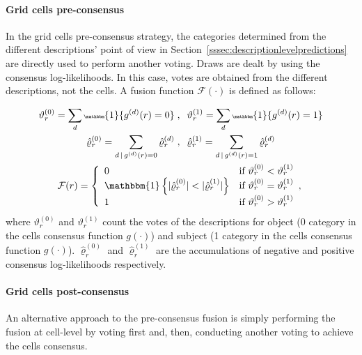 \documentclass[10pt,twocolumn,letterpaper]{article}
\begin{document}
\paragraph{Grid cells pre-consensus}

In the grid cells pre-consensus strategy, the categories determined from the different descriptions' point of view in Section~\ref{sssec:descriptionlevelpredictions} are directly used to perform another voting. Draws are dealt by using the consensus log-likelihoods. In this case, votes are obtained from the different descriptions, not the cells. A fusion function $\mathcal{F}(\cdot)$ is defined as follows:

\begin{gather*}\tiny
\vartheta_r^{(0)} = \sum_{d} \mathbbm{1}\{ g^{(d)}(r) = 0 \} \; , \;\; \vartheta_r^{(1)} = \sum_{d} \mathbbm{1}\{ g^{(d)}(r) = 1 \} \\
\hat{\varrho}_r^{(0)} = \sum_{d \,|\, g^{(d)}(r) = 0} \hat{\varrho}_r^{(d)} \; , \;\; \hat{\varrho}_r^{(1)}  =\sum_{d \,|\, g^{(d)}(r) = 1} \hat{\varrho}_r^{(d)} \\
\mathcal{F}(r) =
\left\{
	\begin{array}{ll}
		0  &  \mbox{if } \vartheta_r^{(0)} < \vartheta_r^{(1)}   \\
		\mathbbm{1}\left\{ | \hat{\varrho}_r^{(0)} | < | \hat{\varrho}_r^{(1)} | \right\} &  \mbox{if } \vartheta_r^{(0)} = \vartheta_r^{(1)}   \\
		1 &  \mbox{if } \vartheta_r^{(0)} > \vartheta_r^{(1)}   \\
	\end{array},
\right.
\end{gather*}
where $\vartheta_r^{(0)}$ and $\vartheta_r^{(1)}$ count the votes of the descriptions for object (0 category in the cells consensus function $g(\cdot)$) and subject (1 category in the cells consensus function $g(\cdot)$). $\hat{\varrho}_r^{(0)}$ and $\hat{\varrho}_r^{(1)}$ are the accumulations of negative and positive consensus log-likelihoods respectively.

\paragraph{Grid cells post-consensus}

An alternative approach to the pre-consensus fusion is simply performing the fusion at cell-level by voting first and, then, conducting another voting to achieve the cells consensus.
\end{document}
